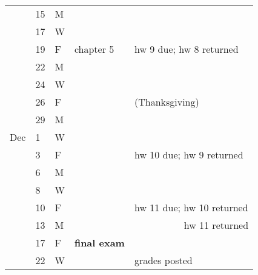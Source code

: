 \documentclass{article}
\begin{document}
\begin{center}
\begin{tabular*}{0.99\textwidth}{%
    p{}p{}p{}
    |p{}
    |p{}}
& 15 & M & & \\
& 17 & W & & \\
& 19 & F & chapter 5 & hw 9 due; hw 8 returned\\ \hline
& 22 & M & & \\
& 24 & W & & \\
& 26 & F & & (Thanksgiving)\\ \hline
& 29 & M & &  \\
Dec
& 1 & W & &  \\
& 3 & F & & hw 10 due; hw 9 returned\\ \hline
& 6 & M & &  \\
& 8 & W & & \\
& 10 & F & & hw 11 due; hw 10 returned\\ \hline
& 13 & M & & $\phantom{\textrm{hw 11 due;}}$ hw 11 returned\\
& 17 & F & \textbf{final exam} & \\ \hline
& 22 & W & & grades posted
\end{tabular*}
\end{center}
\end{document}
